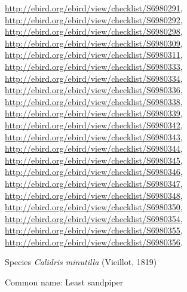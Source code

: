 \documentclass[9pt, article]{memoir}
\begin{document}
\begin{multicols}{2}
\url{http://ebird.org/ebird/view/checklist/S6980291}, 
\url{http://ebird.org/ebird/view/checklist/S6980292}, 
\url{http://ebird.org/ebird/view/checklist/S6980298}, 
\url{http://ebird.org/ebird/view/checklist/S6980309}, 
\url{http://ebird.org/ebird/view/checklist/S6980311}, 
\url{http://ebird.org/ebird/view/checklist/S6980333}, 
\url{http://ebird.org/ebird/view/checklist/S6980334}, 
\url{http://ebird.org/ebird/view/checklist/S6980336}, 
\url{http://ebird.org/ebird/view/checklist/S6980338}, 
\url{http://ebird.org/ebird/view/checklist/S6980339}, 
\url{http://ebird.org/ebird/view/checklist/S6980342}, 
\url{http://ebird.org/ebird/view/checklist/S6980343}, 
\url{http://ebird.org/ebird/view/checklist/S6980344}, 
\url{http://ebird.org/ebird/view/checklist/S6980345}, 
\url{http://ebird.org/ebird/view/checklist/S6980346}, 
\url{http://ebird.org/ebird/view/checklist/S6980347}, 
\url{http://ebird.org/ebird/view/checklist/S6980348}, 
\url{http://ebird.org/ebird/view/checklist/S6980350}, 
\url{http://ebird.org/ebird/view/checklist/S6980354}, 
\url{http://ebird.org/ebird/view/checklist/S6980355}, 
\url{http://ebird.org/ebird/view/checklist/S6980356}.

\vspace{6pt}\noindent\hspace{36pt}Species \textit{Calidris minutilla} (Vieillot, 1819)


Common name: Least sandpiper


\end{multicols}
\end{document}

